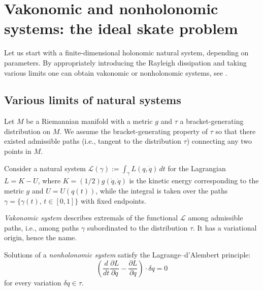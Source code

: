 \documentclass[11pt]{article}
\theoremstyle{definition}
\newcounter{ai}
\begin{document}

\section{Vakonomic and nonholonomic systems: the ideal skate problem}\label{sect:skate}

Let us start with a finite-dimensional holonomic natural system, depending on parameters. By appropriately introducing 
the Rayleigh dissipation and taking various limits one can obtain  vakonomic or nonholonomic systems, see \cite{kozlov1983realization, kozlov1992problem}. 




\subsection{Various limits of natural systems}

Let $M$ be a Riemannian  manifold with a metric $g$ and $\tau$ a bracket-generating distribution on $M$. 
We assume the bracket-generating property of $\tau$ so that there existed admissible paths (i.e., tangent to the distribution $\tau$) connecting any two points in $M$.


Consider a natural system $\mathcal L(\gamma):=\int_{\gamma} L(q, \dot q) \, dt$ for the Lagrangian $L=K-U$, where
$K=(1/2)g(\dot q, \dot q)$ is the kinetic energy corresponding to the metric $g$ and $U=U(q(t))$, while the integral is taken over the paths $\gamma=\{\gamma(t), \, t\in [0,1]\}$ with fixed endpoints. 


{\it Vakonomic system} describes extremals of the functional $\mathcal L$ among admissible paths, i.e., among paths $\gamma$ subordinated to the distribution $\tau$. It has a variational origin, hence the name.

Solutions of a {\it nonholonomic system} satisfy the Lagrange--d'Alembert principle:
 $$
 \left(\frac{d}{dt}\frac{\partial L}{\partial \dot q}-\frac{\partial L}{\partial q}\right)\cdot \delta q=0
 $$ for every variation $\delta q\in \tau$. 
\end{document}
